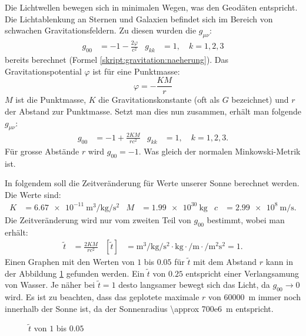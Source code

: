 \begin{refsection}
Die Lichtwellen bewegen sich in minimalen Wegen, was den Geodäten
entspricht.  Die Lichtablenkung an Sternen und Galaxien befindet sich
im Bereich von schwachen Gravitationsfeldern.  Zu diesen wurden die
\(g_{\mu\nu}\):
\begin{align*}
  g_{00} &= -1 -\frac{2\varphi}{c^2} &g_{kk} &= 1,\quad k=1,2,3
\end{align*}
bereits berechnet (Formel \ref{skript:gravitation:naeherung}).
Das Gravitationspotential \(\varphi\) ist für eine Punktmasse:
\begin{equation*}
  \varphi = -\frac{KM}{r}
\end{equation*}
\(M\) ist die Punktmasse, \(K\) die Gravitationskonstante
(oft als \(G\) bezeichnet) und \(r\) der Abstand zur Punktmasse.
Setzt man dies nun zusammen, erhält man folgende \(g_{\mu\nu}\):
\begin{align*}
  g_{00} &= -1 +\frac{2KM}{rc^2} &g_{kk} &= 1,\quad k=1,2,3.
\end{align*}
Für grosse Abstände \(r\) wird \(g_{00}=-1\).  Was gleich der normalen
Minkowski-Metrik ist.

\begin{beispiel}
  In folgendem soll die Zeitveränderung für Werte unserer Sonne
  berechnet werden.  Die Werte sind:
  \begin{align*}
    K &= \SI{6.67e-11}{\meter\cubed\per\kilogram\per\second\squared}
    &M &= \SI{1.99e30}{\kilogram}
    &c &= \SI{2.99e8}{\meter\per\second}.
  \end{align*}
  Die Zeitveränderung wird nur vom zweiten Teil von \(g_{00}\)
  bestimmt, wobei man erhält:
  \begin{align*}
    \tilde{t} &= \frac{2KM}{rc^2}
    &\left[\tilde{t}\right] &=
                              \si{\meter\cubed\per\kilogram\per\second\squared}
                              \cdot \si{\kilogram}
                              \cdot \si{\per\meter}
                              \cdot \si{\per\meter\squared\second\squared}
                              = 1.
  \end{align*}
  Einen Graphen mit den Werten von \(1\) bis \(0.05\) für
  \(\tilde{t}\) mit dem Abstand \(r\) kann in der Abbildung
  \ref{fig:bsp1} gefunden werden.  Ein \(\tilde{t}\) von \(0.25\)
  entspricht einer Verlangsamung von Wasser.  Je näher bei
  \(\tilde{t}=1\) desto langsamer bewegt sich das Licht, da
  \(g_{00} \rightarrow 0\) wird.  Es ist zu beachten, dass das
  geplotete maximale \(r\) von \SI{60000}{\meter} immer noch innerhalb
  der Sonne ist, da der Sonnenradius \SI{\approx 700e6}{\meter}
  entspricht.
  \begin{figure}
    \centering
    
    \caption{\(\tilde{t}\) von \(1\) bis \(0.05\)}
    \label{fig:bsp1}
  \end{figure}
\end{beispiel}


\end{refsection}
